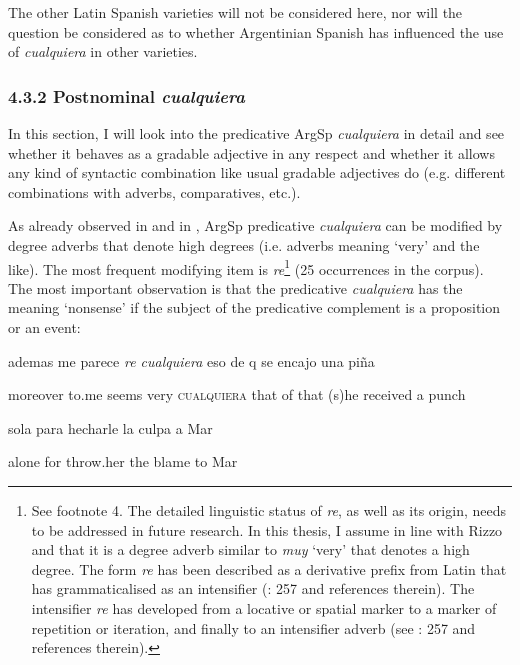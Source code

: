 \documentclass[output=paper]{langscibook}
\begin{document}
  The other Latin Spanish varieties will not be considered here, nor will the question be considered as to whether Argentinian Spanish has influenced the use of \textit{cualquiera} in other varieties. 

\subsubsection{\textbf{4.3.2} \textbf{Postnominal} \textbf{\textit{cualquiera}}}

In this section, I will look into the predicative ArgSp \textit{cualquiera} in detail and see whether it behaves as a gradable adjective in any respect and whether it allows any kind of syntactic combination like usual gradable adjectives do (e.g. different combinations with adverbs, comparatives, etc.). 

  As already observed in  and in , ArgSp predicative \textit{cualquiera} can be modified by degree adverbs that denote high degrees (i.e. adverbs meaning ‘very’ and the like). The most frequent modifying item is \textit{re}\footnote{\textrm{See footnote 4. The detailed linguistic status of} \textrm{\textit{re}}\textrm{, as well as its origin, needs to be addressed in future research. In this thesis, I assume in line with Rizzo \citet{Salierno2013} and \citet{KanwitTerán2020} that it is a degree adverb similar to} \textrm{\textit{muy}} \textrm{‘very’ that denotes a high degree. The form} \textrm{\textit{re}} \textrm{has been described as a derivative prefix from Latin that has grammaticalised as an intensifier (\citealt{KanwitTerán2020}: 257 and references therein). The intensifier} \textrm{\textit{re}} \textrm{has developed from a locative or spatial marker to a marker of repetition or iteration, and finally to an intensifier adverb (see \citealt{KanwitTerán2020}: 257 and references therein).}} (25 occurrences in the corpus). The most important observation is that the predicative \textit{cualquiera} has the meaning ‘nonsense’ if the subject of the predicative complement is a proposition or an event: 

    ademas  me  parece  \textit{re  cualquiera} eso  de  q  se  encajo  una  piña  

    moreover  to.me  seems  very  \textsc{cualquiera}  that  of  that  (s)he  received  a  punch  

    sola  para  hecharle  la  culpa  a  Mar

    alone  for  throw.her  the  blame  to  Mar
\end{document}
